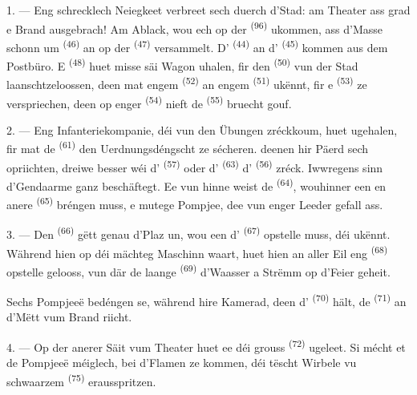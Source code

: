 \VUsaut{5.0mm}
\VUsaut{3.0mm}

\VUsaut{3.4mm}

1. --- Eng schrecklech Neiegkeet verbreet sech duerch d'Stad: am Theater ass grad e
Brand ausgebrach! Am Ablack, wou ech op der  \textsuperscript{(96)}
ukommen, ass d'Masse schonn um  \textsuperscript{(46)} an op der
 \textsuperscript{(47)} versammelt. D'
\textsuperscript{(44)} an d' \textsuperscript{(45)} kommen aus
dem Postbüro. E  \textsuperscript{(48)} huet misse säi Wagon
uhalen, fir den  \textsuperscript{(50)} vun der Stad
laanschtzeloossen, deen mat engem  \textsuperscript{(52)} an engem
 \textsuperscript{(51)} ukënnt, fir e 
\textsuperscript{(53)} ze verspriechen, deen op enger 
\textsuperscript{(54)} nieft de  \textsuperscript{(55)} bruecht
gouf.

2. --- Eng Infanteriekompanie, déi vun den Übungen zréckkoum, huet ugehalen, fir mat
de  \textsuperscript{(61)} den Uerdnungsdéngscht ze
sécheren.  deenen hir Päerd sech opriichten, dreiwe besser wéi
d' \textsuperscript{(57)} oder d'
\textsuperscript{(63)} d' \textsuperscript{(56)} zréck. Iwwregens sinn
d'Gendaarme ganz
beschäftegt. Ee vun hinne weist de  \textsuperscript{(64)}, wouhinner
een en anere  \textsuperscript{(65)} bréngen muss, e mutege
Pompjee, dee vun enger Leeder gefall ass.

3. --- Den  \textsuperscript{(66)} gëtt genau d'Plaz un, wou een
d' \textsuperscript{(67)} opstelle muss, déi ukënnt. Während hien
op déi mächteg Maschinn waart, huet hien an aller Eil eng 
\textsuperscript{(68)} opstelle gelooss, vun där de laange 
\textsuperscript{(69)} d'Waasser a Strëmm op d'Feier geheit.

Sechs Pompjeeë bedéngen se, während hire Kamerad, deen d'
\textsuperscript{(70)} hält, de  \textsuperscript{(71)} an d'Mëtt vum
Brand riicht.

4. --- Op der anerer Säit vum Theater huet ee déi grouss 
\textsuperscript{(72)} ugeleet. Si mécht et de Pompjeeë méiglech, bei d'Flamen ze
kommen, déi tëscht Wirbele vu schwaarzem  \textsuperscript{(75)}
erausspritzen.

